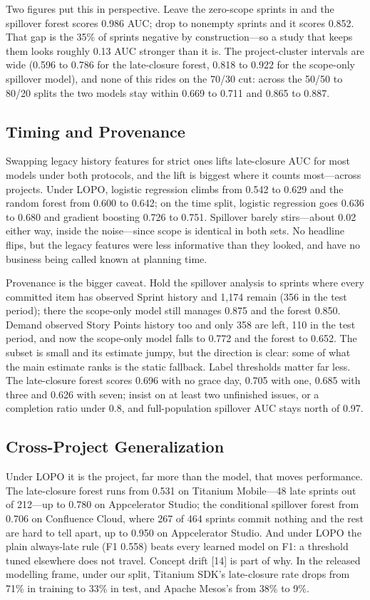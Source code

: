 \documentclass[conference]{IEEEtran}
\begin{document}
Two figures put this in perspective. Leave the zero-scope sprints in and the spillover forest scores 0.986 AUC; drop to nonempty sprints and it scores 0.852. That gap is the 35\% of sprints negative by construction---so a study that keeps them looks roughly 0.13 AUC stronger than it is. The project-cluster intervals are wide (0.596 to 0.786 for the late-closure forest, 0.818 to 0.922 for the scope-only spillover model), and none of this rides on the 70/30 cut: across the 50/50 to 80/20 splits the two models stay within 0.669 to 0.711 and 0.865 to 0.887.

\subsection{Timing and Provenance}

Swapping legacy history features for strict ones lifts late-closure AUC for most models under both protocols, and the lift is biggest where it counts most---across projects. Under LOPO, logistic regression climbs from 0.542 to 0.629 and the random forest from 0.600 to 0.642; on the time split, logistic regression goes 0.636 to 0.680 and gradient boosting 0.726 to 0.751. Spillover barely stirs---about 0.02 either way, inside the noise---since scope is identical in both sets. No headline flips, but the legacy features were less informative than they looked, and have no business being called known at planning time.

Provenance is the bigger caveat. Hold the spillover analysis to sprints where every committed item has observed Sprint history and 1,174 remain (356 in the test period); there the scope-only model still manages 0.875 and the forest 0.850. Demand observed Story Points history too and only 358 are left, 110 in the test period, and now the scope-only model falls to 0.772 and the forest to 0.652. The subset is small and its estimate jumpy, but the direction is clear: some of what the main estimate ranks is the static fallback. Label thresholds matter far less. The late-closure forest scores 0.696 with no grace day, 0.705 with one, 0.685 with three and 0.626 with seven; insist on at least two unfinished issues, or a completion ratio under 0.8, and full-population spillover AUC stays north of 0.97.

\subsection{Cross-Project Generalization}

Under LOPO it is the project, far more than the model, that moves performance. The late-closure forest runs from 0.531 on Titanium Mobile---48 late sprints out of 212---up to 0.780 on Appcelerator Studio; the conditional spillover forest from 0.706 on Confluence Cloud, where 267 of 464 sprints commit nothing and the rest are hard to tell apart, up to 0.950 on Appcelerator Studio. And under LOPO the plain always-late rule (F1 0.558) beats every learned model on F1: a threshold tuned elsewhere does not travel. Concept drift [14] is part of why. In the released modelling frame, under our split, Titanium SDK's late-closure rate drops from 71\% in training to 33\% in test, and Apache Mesos's from 38\% to 9\%.
\end{document}
